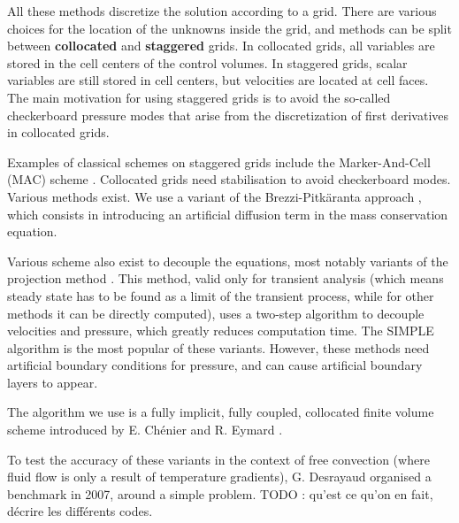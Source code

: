 \documentclass[12pt]{article}
\begin{document}
All these methods discretize the solution according to a grid. There
are various choices for the location of the unknowns inside the grid,
and methods can be split between {\bf collocated} and {\bf staggered}
grids. In collocated grids, all variables are stored in the cell
centers of the control volumes. In staggered grids, scalar variables
are still stored in cell centers, but velocities are located at cell
faces. The main motivation for using staggered grids is to avoid the
so-called checkerboard pressure modes that arise from the
discretization of first derivatives in collocated grids.

Examples of classical schemes on staggered grids include the
Marker-And-Cell (MAC) scheme
\cite{har-65-num,Pat-80-num,har-65-num,nic-92-ana,cho-97-ana,cho-97-mac}. Collocated
grids need stabilisation to avoid checkerboard modes. Various methods
exist. We use a variant of the Brezzi-Pitk{\"a}ranta approach
\cite{mat-97-apr,brezzip,brezzip2}, which consists in introducing an
artificial diffusion term in the mass conservation equation.

Various scheme also exist to decouple the equations, most notably
variants of the projection method \cite{mat-97-pre}. This method,
valid only for transient analysis (which means steady state has to be
found as a limit of the transient process, while for other methods it
can be directly computed), uses a two-step algorithm to decouple
velocities and pressure, which greatly reduces computation time. The
SIMPLE algorithm is the most popular of these variants. However, these
methods need artificial boundary conditions for pressure, and can
cause artificial boundary layers to appear.

The algorithm we use is a fully implicit, fully coupled, collocated
finite volume scheme introduced by E. Chénier and R. Eymard
\cite{che-09-col,che-08-col,che-06-num}.

To test the accuracy of these variants in the context of free
convection (where fluid flow is only a result of temperature
gradients), G. Desrayaud organised a benchmark in 2007, around a
simple problem. TODO : qu'est ce qu'on en fait, décrire les différents
codes.



\end{document}
